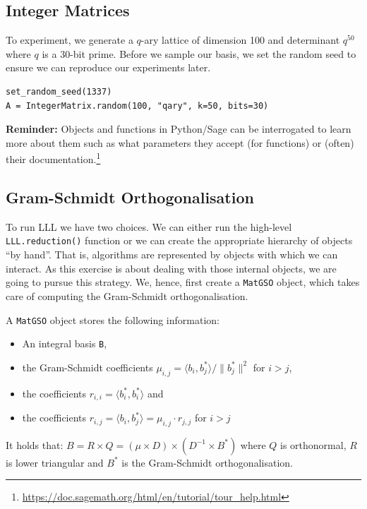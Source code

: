 \documentclass[10pt,a4paper,nobib]{tufte-handout}
\begin{document}
\subsection{Integer Matrices}
\label{sec:orgafa4577}

To experiment, we generate a \(q\)-ary lattice of dimension 100 and determinant \(q^{50}\) where \(q\) is a 30-bit prime. Before we sample our basis, we set the random seed to ensure we can reproduce our experiments later.

\lstset{language=sage,label= ,caption= ,captionpos=b,numbers=none}
\begin{lstlisting}
set_random_seed(1337)
A = IntegerMatrix.random(100, "qary", k=50, bits=30)
\end{lstlisting}

\textbf{Reminder:} Objects and functions in Python/Sage can be interrogated to learn more about them such as what parameters they accept (for functions) or (often) their documentation.\footnote{\url{https://doc.sagemath.org/html/en/tutorial/tour\_help.html}}

\subsection{Gram-Schmidt Orthogonalisation}
\label{sec:org4c2955b}

To run LLL we have two choices. We can either run the high-level \texttt{LLL.reduction()} function or we can create the appropriate hierarchy of objects “by hand”. That is, algorithms are represented by objects with which we can interact. As this exercise is about dealing with those internal objects, we are going to pursue this strategy. We, hence, first create a \texttt{MatGSO} object, which takes care of computing the Gram-Schmidt orthogonalisation. 

A \texttt{MatGSO} object stores the following information:

\begin{itemize}
\item An integral basis \texttt{B},
\item the Gram-Schmidt coefficients \(μ_{i,j} = ⟨b_i, b^*_j⟩ / \|b^*_j\|^2\) for \(i>j\),
\item the coefficients \(r_{i,i} = ⟨b^*_i, b^*_i⟩\) and
\item the coefficients \(r_{i,j} = ⟨b_i, b^*_j⟩ = μ_{i,j} ⋅ r_{j,j}\) for \(i>j\)
\end{itemize}

It holds that: \(B = R × Q = (μ × D) × (D^{-1} × B^*)\) where \(Q\) is orthonormal, \(R\) is lower triangular and \(B^*\) is the Gram-Schmidt orthogonalisation.
\end{document}
